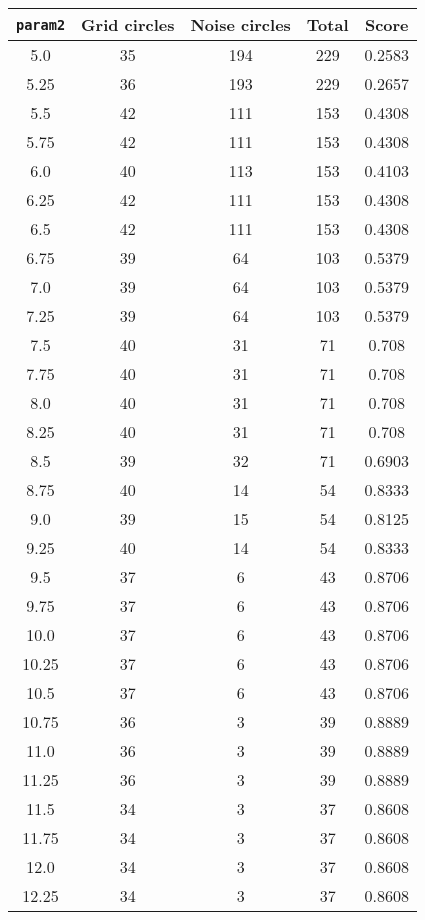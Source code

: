 \documentclass[letterpaper, 12pt]{article}
\begin{document}
\begin{longtable}{|c|c|c|c|c|}
\hline
\textbf{\texttt{param2}} & \textbf{Grid circles} & \textbf{Noise circles} & \textbf{Total} & \textbf{Score} \\
\hline
5.0 & 35 & 194 & 229 & 0.2583 \\
\hline
5.25 & 36 & 193 & 229 & 0.2657 \\
\hline
5.5 & 42 & 111 & 153 & 0.4308 \\
\hline
5.75 & 42 & 111 & 153 & 0.4308 \\
\hline
6.0 & 40 & 113 & 153 & 0.4103 \\
\hline
6.25 & 42 & 111 & 153 & 0.4308 \\
\hline
6.5 & 42 & 111 & 153 & 0.4308 \\
\hline
6.75 & 39 & 64 & 103 & 0.5379 \\
\hline
7.0 & 39 & 64 & 103 & 0.5379 \\
\hline
7.25 & 39 & 64 & 103 & 0.5379 \\
\hline
7.5 & 40 & 31 & 71 & 0.708 \\
\hline
7.75 & 40 & 31 & 71 & 0.708 \\
\hline
8.0 & 40 & 31 & 71 & 0.708 \\
\hline
8.25 & 40 & 31 & 71 & 0.708 \\
\hline
8.5 & 39 & 32 & 71 & 0.6903 \\
\hline
8.75 & 40 & 14 & 54 & 0.8333 \\
\hline
9.0 & 39 & 15 & 54 & 0.8125 \\
\hline
9.25 & 40 & 14 & 54 & 0.8333 \\
\hline
9.5 & 37 & 6 & 43 & 0.8706 \\
\hline
9.75 & 37 & 6 & 43 & 0.8706 \\
\hline
10.0 & 37 & 6 & 43 & 0.8706 \\
\hline
10.25 & 37 & 6 & 43 & 0.8706 \\
\hline
10.5 & 37 & 6 & 43 & 0.8706 \\
\hline
10.75 & 36 & 3 & 39 & 0.8889 \\
\hline
11.0 & 36 & 3 & 39 & 0.8889 \\
\hline
11.25 & 36 & 3 & 39 & 0.8889 \\
\hline
11.5 & 34 & 3 & 37 & 0.8608 \\
\hline
11.75 & 34 & 3 & 37 & 0.8608 \\
\hline
12.0 & 34 & 3 & 37 & 0.8608 \\
\hline
12.25 & 34 & 3 & 37 & 0.8608 \\
\hline

\end{longtable}
\end{document}
